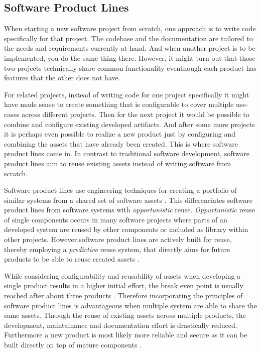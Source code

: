 \documentclass[a4paper]{article}
\begin{document}
\subsection{Software Product Lines}\label{spl}

When starting a new software project from scratch, one approach is to write code specifically for that project. The codebase and the documentation are tailored to the needs and requirements currently at hand. And when another project is to be implemented, you do the same thing there. However, it might turn out that those two projects technically share common functionality eventhough each product has features that the other does not have.

For related projects, instead of writing code for one project specifically it might have made sense to create something that is configurable to cover multiple use-cases across different projects. Then for the next project it would be possible to combine and configure existing developed artifacts. And after some more projects it is perhaps even possible to realize a new product just by configuring and combining the assets that have already been created. This is where software product lines come in. In contrast to traditional software development, software product lines aim to reuse existing assets instead of writing software from scratch.

Software product lines use engineering techniques for creating a portfolio of similar systems from a shared set of software assets \cite{Intro}. This differenciates software product lines from software systems with \emph{opportunistic} reuse. \emph{Oppurtunistic} reuse of single components occurs in many software projects where parts of an developed system are reused by other components or included as library within other projects. However,software product lines are actively built for reuse, thereby employing a \emph{predictive} reuse system, that directly aims for future products to be able to reuse created assets \cite{Intro}.

While considering configurability and reusability of assets when developing a single product results in a higher initial effort, the break even point is usually reached after about three products \cite[p.4]{spl-in-action} \cite[p.10]{Pohl:2005:SPL:1095605}. Therefore incorporating the principles of software product lines is advantageous when multiple system are able to share the same assets. Through the reuse of existing assets across multiple products, the development, maintainance and documentation effort is drastically reduced. Furthermore a new product is most likely more reliable and secure as it can be built directly on top of mature components  \cite[p.4f]{spl-in-action}. 
\end{document}
